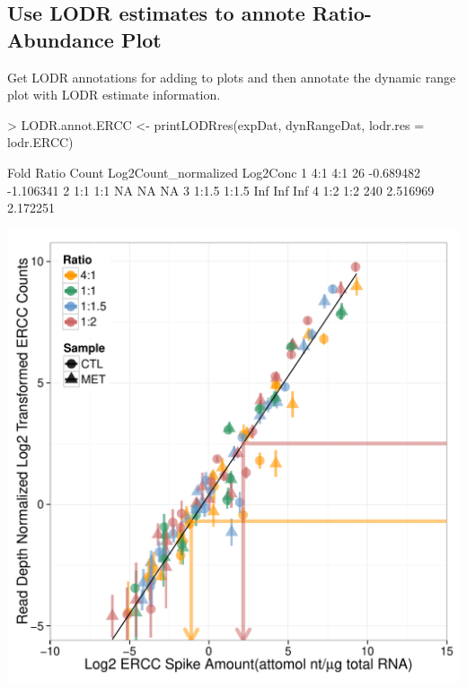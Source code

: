 \documentclass{article}
\begin{document}
\subsection{Use LODR estimates to annote Ratio-Abundance Plot}
Get LODR annotations for adding to plots and then annotate the dynamic range plot with LODR estimate information.
\begin{center}
\begin{Schunk}
\begin{Sinput}
> LODR.annot.ERCC <- printLODRres(expDat, dynRangeDat,
                                  lodr.res = lodr.ERCC)
\end{Sinput}
\begin{Soutput}
   Fold Ratio Count Log2Count_normalized  Log2Conc
1   4:1   4:1    26            -0.689482 -1.106341
2   1:1   1:1    NA                   NA        NA
3 1:1.5 1:1.5   Inf                  Inf       Inf
4   1:2   1:2   240             2.516969  2.172251
\end{Soutput}
\end{Schunk}
\includegraphics{erccdashboardVignette-dynRangeLODRAnnot}
\end{center}
\end{document}
